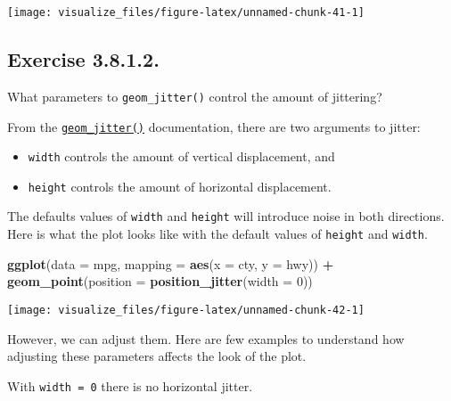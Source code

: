 \documentclass[]{book}
\newenvironment{Shaded}{\begin{snugshade}}{\end{snugshade}}
\newcommand{\DataTypeTok}[1]{\textcolor[rgb]{0.13,0.29,0.53}{#1}}
\newcommand{\DecValTok}[1]{\textcolor[rgb]{0.00,0.00,0.81}{#1}}
\newcommand{\KeywordTok}[1]{\textcolor[rgb]{0.13,0.29,0.53}{\textbf{#1}}}
\newcommand{\NormalTok}[1]{#1}
\newcommand{\OperatorTok}[1]{\textcolor[rgb]{0.81,0.36,0.00}{\textbf{#1}}}
\newcommand{\StringTok}[1]{\textcolor[rgb]{0.31,0.60,0.02}{#1}}
\providecommand{\tightlist}{%
  \setlength{\itemsep}{0pt}\setlength{\parskip}{0pt}}
\theoremstyle{plain}
\theoremstyle{remark}
\begin{document}
\begin{center}\texttt{[image: visualize\_files/figure-latex/unnamed-chunk-41-1]} \end{center}

\hypertarget{exercise-3.8.1.2.}{%
\subsection*{\texorpdfstring{Exercise
{3.8.1.2}.}{Exercise 3.8.1.2.}}\label{exercise-3.8.1.2.}}

What parameters to \texttt{geom\_jitter()} control the amount of
jittering?

From the
\href{https://ggplot2.tidyverse.org/reference/geom_jitter.html}{\texttt{geom\_jitter()}}
documentation, there are two arguments to jitter:

\begin{itemize}
\tightlist
\item
  \texttt{width} controls the amount of vertical displacement, and
\item
  \texttt{height} controls the amount of horizontal displacement.
\end{itemize}

The defaults values of \texttt{width} and \texttt{height} will introduce
noise in both directions. Here is what the plot looks like with the
default values of \texttt{height} and \texttt{width}.

\begin{Shaded}
\begin{Highlighting}[]
\KeywordTok{ggplot}\NormalTok{(}\DataTypeTok{data =}\NormalTok{ mpg, }\DataTypeTok{mapping =} \KeywordTok{aes}\NormalTok{(}\DataTypeTok{x =}\NormalTok{ cty, }\DataTypeTok{y =}\NormalTok{ hwy)) }\OperatorTok{+}
\StringTok{  }\KeywordTok{geom_point}\NormalTok{(}\DataTypeTok{position =} \KeywordTok{position_jitter}\NormalTok{(}\DataTypeTok{width =} \DecValTok{0}\NormalTok{))}
\end{Highlighting}
\end{Shaded}

\begin{center}\texttt{[image: visualize\_files/figure-latex/unnamed-chunk-42-1]} \end{center}

However, we can adjust them. Here are few examples to understand how
adjusting these parameters affects the look of the plot.

With \texttt{width\ =\ 0} there is no horizontal jitter.
\end{document}
